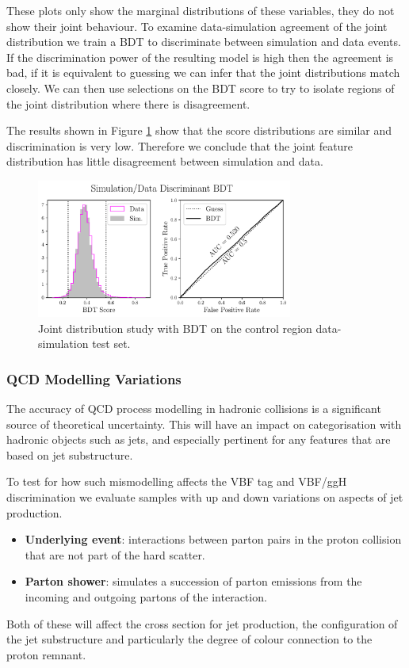 These plots only show the marginal distributions of these variables, they do not show their joint behaviour. 
To examine data-simulation agreement of the joint distribution we train a BDT to discriminate between simulation and data events. 
If the discrimination power of the resulting model is high then the agreement is bad, if it is equivalent to guessing we can infer that the joint distributions match closely. 
We can then use selections on the BDT score to try to isolate regions of the joint distribution where there is disagreement. 

The results shown in Figure \ref{fig:event_categorisation:zee_bdt_validation} show that the score distributions are similar and discrimination is very low. 
Therefore we conclude that the joint feature distribution has little disagreement between simulation and data. 
\begin{figure}[h!]
    \centering
    \includegraphics[width=0.75\textwidth]{figures/event_selection/eng_feature_ROC_Zee_BDT.pdf}
    \caption{Joint distribution study with BDT on the \Zee control region data-simulation test set.}
    \label{fig:event_categorisation:zee_bdt_validation}
\end{figure}


\subsubsection{QCD Modelling Variations}
The accuracy of QCD process modelling in hadronic collisions is a significant source of theoretical uncertainty. 
This will have an impact on categorisation with hadronic objects such as jets, and especially pertinent for any features that are based on jet substructure. 

To test for how such mismodelling affects the VBF tag and VBF/ggH discrimination we evaluate samples with up and down variations on aspects of jet production.
\begin{itemize}[noitemsep]
    \item \textbf{Underlying event}: interactions between parton pairs in the proton collision that are not part of the hard scatter. 
    \item \textbf{Parton shower}: simulates a succession of parton emissions from the incoming and outgoing partons of the interaction.
\end{itemize}
Both of these will affect the cross section for jet production, the configuration of the jet substructure and particularly the degree of colour connection to the proton remnant.

